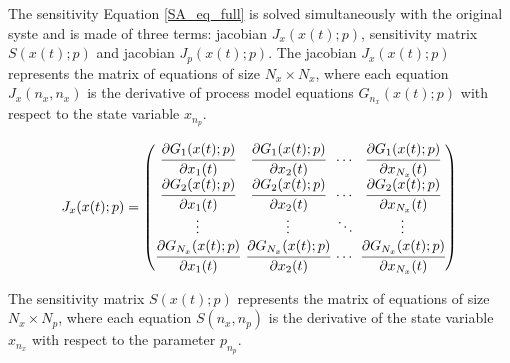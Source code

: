 \documentclass[../Article_Model_Parameters.tex]{subfiles}
\begin{document}
	The sensitivity Equation \ref{SA_eq_full} is solved simultaneously with the original syste and is made of three terms: jacobian ${J_x}({x}(t);{p})$, sensitivity matrix ${S}({x}(t);{p})$ and jacobian ${J_p}({x}(t);{p})$. The jacobian ${J_x}({x}(t);{p})$ represents the matrix of equations of size $N_x \times N_x$, where each equation ${J_x}(n_x,n_x)$ is the derivative of process model equations ${G}_{n_x}({x}(t);{p})$ with respect to the state variable $x_{n_p}$.
	
	{\footnotesize
		\begin{align}
			\begingroup %
			\setlength\arraycolsep{2pt}
			{J_x}({x}(t);{p})=\begin{pmatrix}
				\cfrac{\partial {G_{1}}({x}(t);{p})}{\partial {x_{1}}(t)} & \cfrac{\partial {G_{1}}({x}(t);{p})}{\partial {x_{2}}(t)} & \cdots & \cfrac{\partial {G_{1}}({x}(t);{p})}{\partial {x_{N_x}}(t)}\\
				\cfrac{\partial {G_{2}}({x}(t);{p})}{\partial {x_{1}}(t)} & \cfrac{\partial {G_{2}}({x}(t);{p})}{\partial {x_{2}}(t)} & \cdots & \cfrac{\partial {G_{2}}({x}(t);{p})}{\partial {x_{N_x}}(t)}\\
				\vdots & \vdots & \ddots & \vdots\\ 
				\cfrac{\partial {G_{N_x}}({x}(t);{p})}{\partial {x_{1}}(t)} & \cfrac{\partial {G_{N_x}}({x}(t);{p})}{\partial {x_{2}}(t)} & \cdots & \cfrac{\partial {G_{N_x}}({x}(t);{p})}{\partial {x_{N_x}}(t)}\\
			\end{pmatrix}
			\endgroup
	\end{align} }
	
	The sensitivity matrix ${S}({x}(t);{p})$ represents the matrix of equations of size $N_x \times N_p$, where each equation ${S}(n_x,n_p)$ is the derivative of the state variable $x_{n_x}$ with respect to the parameter $p_{n_p}$.
	
\end{document}
